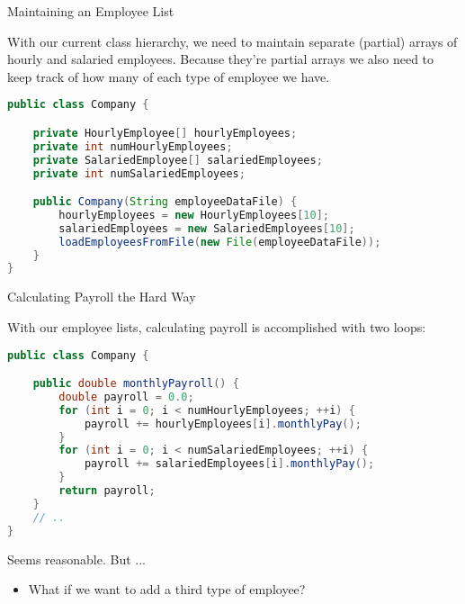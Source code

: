 \documentclass{beamer}
\begin{document}
\begin{frame}[fragile]{Maintaining an Employee List}


With our current class hierarchy, we need to maintain separate (partial) arrays of hourly and salaried employees.  Because they're partial arrays we also need to keep track of how many of each type of employee we have.
\begin{lstlisting}[language=Java]
public class Company {

    private HourlyEmployee[] hourlyEmployees;
    private int numHourlyEmployees;
    private SalariedEmployee[] salariedEmployees;
    private int numSalariedEmployees;

    public Company(String employeeDataFile) {
        hourlyEmployees = new HourlyEmployees[10];
        salariedEmployees = new SalariedEmployees[10];
        loadEmployeesFromFile(new File(employeeDataFile));
    }
}
\end{lstlisting}


\end{frame}

\begin{frame}[fragile]{Calculating Payroll the Hard Way}


With our employee lists, calculating payroll is accomplished with two loops:
\begin{lstlisting}[language=Java]
public class Company {

    public double monthlyPayroll() {
        double payroll = 0.0;
        for (int i = 0; i < numHourlyEmployees; ++i) {
            payroll += hourlyEmployees[i].monthlyPay();
        }
        for (int i = 0; i < numSalariedEmployees; ++i) {
            payroll += salariedEmployees[i].monthlyPay();
        }
        return payroll;
    }
    // ..
}
\end{lstlisting}
Seems reasonable.  But ...
\begin{itemize}
\item What if we want to add a third type of employee?
\end{itemize}


\end{frame}
\end{document}
